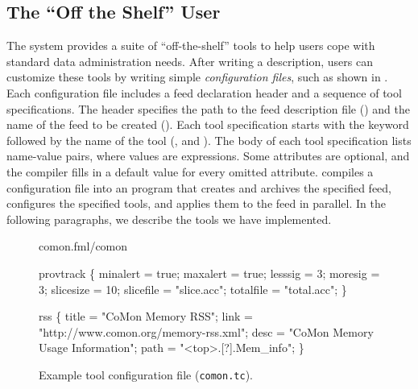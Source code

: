 \subsection{The ``Off the Shelf'' User}
\label{sec:tools}
The \padsd{} system provides a suite of ``off-the-shelf'' tools to
help users cope with standard data administration needs.  After writing
a \padsd{} description, users can customize these tools by
writing simple {\em configuration files}, such as shown in
.   
Each configuration file includes a feed declaration header 
and a sequence of tool specifications. The header specifies the path to the 
feed description file () and the name of the feed to be created ().
Each tool specification starts with the keyword  followed by the
name of the tool (\eg{},  and ). The body of each tool specification 
lists name-value pairs, where values are \ocaml{} expressions. Some attributes are 
optional, and the compiler fills in a default value for every omitted attribute.
\padsd{} compiles a configuration file into an \ocaml{} program that creates and archives the specified 
feed, configures the specified tools, and applies them to the feed in parallel.
In the following paragraphs, we describe the tools we have implemented.

\begin{figure}[t]
\centering
\begin{codebox}
 comon.fml/comon

 provtrack
\{
  minalert  = true;
  maxalert  = true;
  lesssig   = 3;
  moresig   = 3;
  slicesize = 10;
  slicefile = "slice.acc";
  totalfile = "total.acc";
\}

 rss
\{
  title = "CoMon Memory RSS";
  link  = "http://www.comon.org/memory-rss.xml";
  desc  = "CoMon Memory Usage Information";
  path  = "<top>.[?].Mem_info";
\}
\end{codebox}
\caption{Example tool configuration file (\texttt{comon.tc}).}
\label{fig:toolconfigs}
\end{figure}






